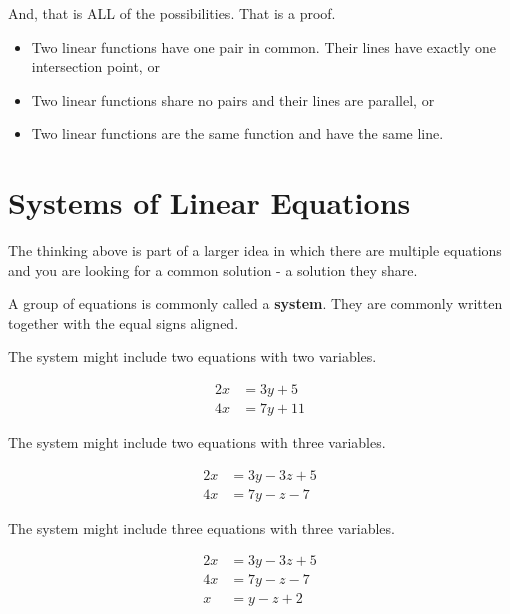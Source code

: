 \documentclass{ximera}
\begin{document}
\begin{explanation}
And, that is ALL of the possibilities.  That is a proof.


\begin{itemize}
\item Two linear functions have one pair in common. Their lines have exactly one intersection point, or

\item Two linear functions share no pairs and their lines are parallel, or

\item Two linear functions are the same function and have the same line.



\end{itemize}





\end{explanation}










\section{Systems of Linear Equations}

The thinking above is part of a larger idea in which there are multiple equations and you are looking for a common solution - a solution they share.

A group of equations is commonly called a \textbf{system}. They are commonly written together with the equal signs aligned.

The system might include two equations with two variables.

\begin{align*}
2x & = 3y + 5 \\
4x & = 7y + 11
\end{align*}



The system might include two equations with three variables.

\begin{align*}
2x & = 3y - 3z + 5 \\
4x & = 7y - z - 7
\end{align*}




The system might include three equations with three variables.

\begin{align*}
2x & = 3y - 3z + 5 \\
4x & = 7y - z - 7 \\
x & = y - z + 2 
\end{align*}
\end{document}
